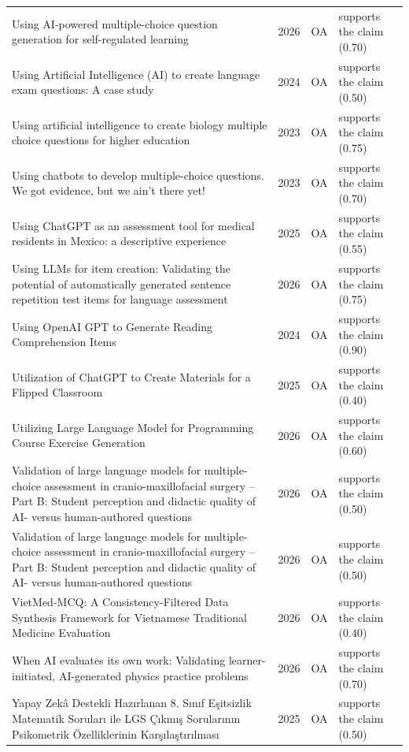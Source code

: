 \begin{longtable}{@{}%
  >{\raggedright\arraybackslash}p{}c%
  >{\raggedright\arraybackslash}p{}%
  >{\raggedright\arraybackslash}p{}@{}}
Using AI-powered multiple-choice question generation for self-regulated learning & 2026 & OA & supports the claim (0.70) \\
Using Artificial Intelligence (AI) to create language exam questions: A case study & 2024 & OA & supports the claim (0.50) \\
Using artificial intelligence to create biology multiple choice questions for higher education & 2023 & OA & supports the claim (0.75) \\
Using chatbots to develop multiple-choice questions. We got evidence, but we ain't there yet! & 2023 & OA & supports the claim (0.70) \\
Using ChatGPT as an assessment tool for medical residents in Mexico: a descriptive experience & 2025 & OA & supports the claim (0.55) \\
Using LLMs for item creation: Validating the potential of automatically generated sentence repetition test items for language assessment & 2026 & OA & supports the claim (0.75) \\
Using OpenAI GPT to Generate Reading Comprehension Items & 2024 & OA & supports the claim (0.90) \\
Utilization of ChatGPT to Create Materials for a Flipped Classroom & 2025 & OA & supports the claim (0.40) \\
Utilizing Large Language Model for Programming Course Exercise Generation & 2026 & OA & supports the claim (0.60) \\
Validation of large language models for multiple-choice assessment in cranio-maxillofacial surgery -- Part B: Student perception and didactic quality of AI- versus human-authored questions & 2026 & OA & supports the claim (0.50) \\
Validation of large language models for multiple-choice assessment in cranio-maxillofacial surgery -- Part B: Student perception and didactic quality of AI- versus human-authored questions & 2026 & OA & supports the claim (0.50) \\
VietMed-MCQ: A Consistency-Filtered Data Synthesis Framework for Vietnamese Traditional Medicine Evaluation & 2026 & OA & supports the claim (0.40) \\
When AI evaluates its own work: Validating learner-initiated, AI-generated physics practice problems & 2026 & OA & supports the claim (0.70) \\
Yapay Zekâ Destekli Hazırlanan 8. Sınıf Eşitsizlik Matematik Soruları ile LGS Çıkmış Sorularının Psikometrik Özelliklerinin Karşılaştırılması & 2025 & OA & supports the claim (0.50) \\

\end{longtable}
